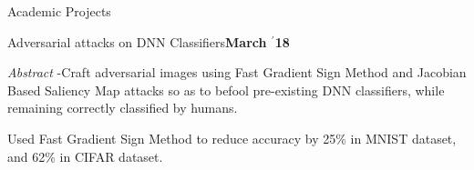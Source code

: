 \documentclass{resume} %
\begin{document}
\begin{rSection}{Academic Projects}



\vspace{-0.5em}
\begin{rSubsection}{ \large Adversarial attacks on DNN Classifiers}{\textbf{\large March $^{\prime}$18}}{}{}

\item \textit{Abstract} -Craft adversarial images using Fast Gradient Sign Method and Jacobian Based Saliency Map attacks so as to befool pre-existing DNN classifiers, while remaining correctly classified by humans. 
\item Used Fast Gradient Sign Method to reduce accuracy by 25\% in MNIST dataset, and 62\% in CIFAR dataset.
\end{rSubsection}


\end{rSection}
\end{document}
